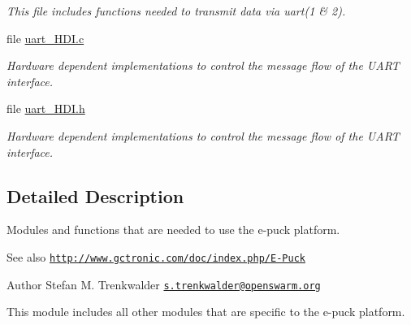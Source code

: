 \begin{DoxyCompactItemize}
\begin{DoxyCompactList}\small\item\em This file includes functions needed to transmit data via uart(1 \& 2). \end{DoxyCompactList}\item 
file \hyperlink{uart__HDI_8c}{uart\+\_\+\+H\+D\+I.\+c}
\begin{DoxyCompactList}\small\item\em Hardware dependent implementations to control the message flow of the U\+A\+R\+T interface. \end{DoxyCompactList}\item 
file \hyperlink{uart__HDI_8h}{uart\+\_\+\+H\+D\+I.\+h}
\begin{DoxyCompactList}\small\item\em Hardware dependent implementations to control the message flow of the U\+A\+R\+T interface. \end{DoxyCompactList}\end{DoxyCompactItemize}


\subsection{Detailed Description}
Modules and functions that are needed to use the e-\/puck platform. 

\begin{DoxySeeAlso}{See also}
\href{http://www.gctronic.com/doc/index.php/E-Puck}{\tt http\+://www.\+gctronic.\+com/doc/index.\+php/\+E-\/\+Puck}
\end{DoxySeeAlso}
\begin{DoxyAuthor}{Author}
Stefan M. Trenkwalder \href{mailto:s.trenkwalder@openswarm.org}{\tt s.\+trenkwalder@openswarm.\+org}
\end{DoxyAuthor}
This module includes all other modules that are specific to the e-\/puck platform.

